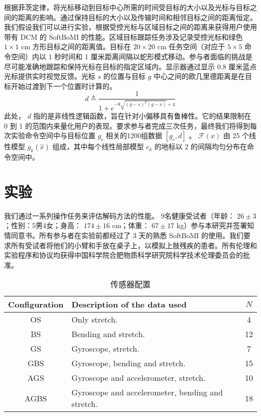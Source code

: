 根据菲茨定律\cite{pittsINFORMATIONCAPACITYHUMANa}，将光标移动到目标中心所需的时间受目标的大小以及光标与目标之间的距离的影响。通过保持目标的大小以及传输时间和相邻目标之间的距离恒定。我们假设我们可以进行实验，根据受控光标与区域目标之间的距离来获得用户使用带有 DCM 的 SoftBoMI 的性能。区域目标跟踪任务涉及记录受控光标和绿色    $1\times1$    cm 方形目标之间的距离值。目标在    $20\times20$    cm 任务空间（对应于    $5\times5$    命令空间）内以 1 秒时间和 1 厘米距离间隔以蛇形模式移动。参与者面临的挑战是尽可能准确地跟踪和保持光标在目标的指定区域内。显示器通过显示 0.8 厘米蓝点光标提供实时视觉反馈。光标    $s$    的位置与目标    $g$    中心之间的欧几里德距离是在目标开始过渡到下一个位置时计算的。
    \begin{equation}
    \label{ex12}
    d \triangleq \frac{1}{1+e^{-8\sqrt{(g-s)^T(g-s)}+4}} 
\end{equation}    此处，   $d$    指的是非线性逻辑函数，旨在针对小偏移具有鲁棒性。它的结果限制在 0 到 1 的范围内来量化用户的表现。要求参与者完成三次任务，最终我们将得到每次实验命令空间中与目标位置   $g_c$   相关的1200组数据   $[g_c,d]$   。    $\mathcal{F}(x)$    由 25 个线性模型    $g_k(\hat x)$    组成，其中每个线性局部模型    $c_k$    的地标以 2 的间隔均匀分布在命令空间中。
   \section{实验  }    我们通过一系列操作任务来评估解码方法的性能。 9名健康受试者（年龄：   $26\pm3$   ；性别：5男4女；身高：   $174\pm16$    cm；体重：   $67\pm17$    kg）参与本研究并签署知情同意书。所有参与者在实验前都经过了 3 天的熟悉 SoftBoMI 的使用。我们要求所有受试者将他们的小臂和手放在桌子上，以模拟上肢残疾的患者。所有伦理和实验程序和协议均获得中国科学院合肥物质科学研究院科学技术伦理委员会的批准。  

   \begin{table}
    \centering
    \caption{传感器配置  }
    \setlength{\tabcolsep}{3pt}
    \begin{tabular}{c p{135pt} c }
    \hline\hline
     Configuration & 
     Description of the data used & 
             $N$          \\ 
    \hline
    OS& Only stretch.& 4 \\ 
    BS& Bending and stretch.&12 \\ 
    GS& Gyroscope, stretch.&7 \\ 
    GBS& Gyroscope, bending and stretch.&15 \\ 
    AGS& Gyroscope and accelerometer, stretch.&10 \\ 
    AGBS& Gyroscope and accelerometer, bending and stretch.&18 \\ 
    \hline\hline
    \end{tabular}
    \label{tab1}
\end{table}     

